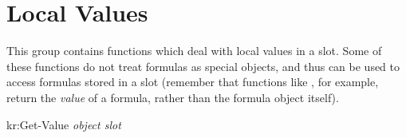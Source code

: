 % 
% 
% 
% 
\section{Local Values}
\value{s-top}

This group contains functions which deal with local values in a slot.
Some of these functions do not
treat formulas as special objects, and thus can be used to access formulas
stored in a slot (remember that functions like , for example,
return the {\it value} of a formula, rather than the formula object itself).


\value{f-top}
\begin{example}
kr:Get-Value {\it object slot}\value{Macro}
\end{example}

